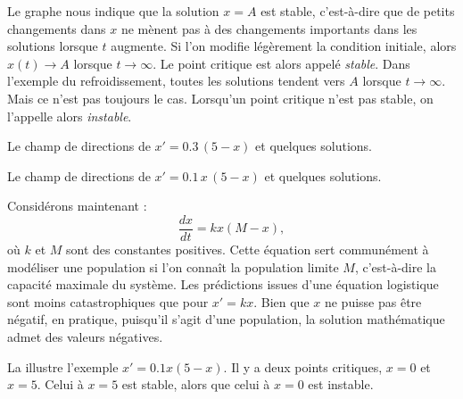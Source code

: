 Le graphe nous indique que la solution $x=A$ est \og{}stable\fg{},
c'est-à-dire que de petits changements dans $x$ ne mènent pas à
des changements importants dans les solutions lorsque $t$ augmente.
Si l'on modifie légèrement la condition initiale, alors $x(t) \to A$ lorsque $t \to \infty$.
Le point critique est alors appelé \emph{stable}.
Dans l'exemple du refroidissement, toutes les solutions tendent vers $A$ lorsque $t \to \infty$.
Mais ce n'est pas toujours le cas.  Lorsqu'un point critique n'est pas stable, on l'appelle alors
\emph{instable}.

\begin{myfig}
	\parbox[t]{3.0in}{
	 \capstart  {}
	 \caption{Le champ de directions de
	 $x' = 0.3\,(5-x)$ et quelques solutions.\label{2.2:coffeefig}}
	}
	\quad
	\parbox[t]{3.0in}{
	 \capstart  {}
	 \caption{Le champ de directions de
	 $x' = 0.1\,x\,(5-x)$ et quelques solutions.\label{2.2:logisticfig}}
	}
\end{myfig}

\medskip

Considérons maintenant \emph{}:
\begin{equation*}
	\frac{dx}{dt} = kx(M-x),
\end{equation*}
où $k$ et $M$ sont des constantes positives.
Cette équation sert communément à modéliser une population si l'on connaît la population limite $M$,
c'est-à-dire la capacité maximale du système.
Les prédictions issues d'une équation logistique sont moins catastrophiques que pour $x'=kx$.
Bien que $x$ ne puisse pas être négatif, en pratique, puisqu'il s'agit d'une population, la solution mathématique admet des valeurs négatives.

La  illustre l'exemple $x' = 0.1 x(5-x)$.
Il y a deux points critiques, $x=0$ et $x=5$.  Celui à
 $x=5$ est stable, alors que celui à $x=0$ est
instable.

